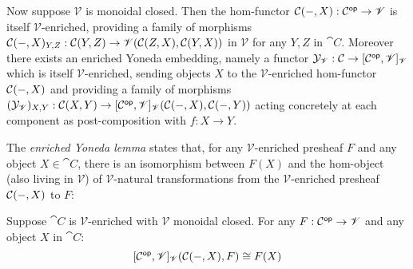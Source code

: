 \noindent Now suppose $\mathscr{V}$ is monoidal closed. Then the hom-functor ${\mathcal{C}}(-,X): \mathcal{C}^{\mathsf{op}}
\to \mathscr{V}$ is itself $\mathscr{V}$-enriched, providing a family of morphisms ${\mathcal{C}}(-,X)_{Y,Z}:
{\mathcal{C}}(Y,Z) \to {\mathscr{V}}({\mathcal{C}}(Z,X),{\mathcal{C}}(Y,X))$ in $\mathscr{V}$ for any
$Y, Z$ in $\cat{C}$. Moreover there exists an enriched Yoneda embedding, namely a functor
$\mathcal{Y}_{\mathscr{V}}: \mathcal{C} \to [\mathcal{C}^{\mathsf{op}},\mathscr{V}]_{\mathscr{V}}$ which is itself
$\mathscr{V}$-enriched, sending objects $X$ to the $\mathscr{V}$-enriched hom-functor ${\mathcal{C}}(-,X)$
and providing a family of morphisms $(\mathcal{Y}_{\mathscr{V}})_{X,Y}: {\mathcal{C}}(X,Y) \to
{[\mathcal{C}^{\mathsf{op}},\mathscr{V}]_{\mathscr{V}}}({\mathcal{C}}(-,X),{\mathcal{C}}(-,Y))$ acting
concretely at each component as post-composition with $f: X \to Y$.

The \emph{enriched Yoneda lemma} states that, for any $\mathscr{V}$-enriched presheaf $F$ and any object $X
\in \cat{C}$, there is an isomorphism between $F(X)$ and the hom-object (also living in $\mathscr{V}$) of
$\mathscr{V}$-natural transformations from the $\mathscr{V}$-enriched presheaf ${\mathcal{C}}(-,X)$ to $F$:

\begin{lemma}
Suppose $\cat{C}$ is $\mathscr{V}$-enriched with $\mathscr{V}$ monoidal closed. For any $F: \mathcal{C}^{\mathsf{op}} \to
\mathscr{V}$ and any object $X$ in $\cat{C}$:
\[{[\mathcal{C}^{\mathsf{op}},\mathscr{V}]_{\mathscr{V}}}({\mathcal{C}}(-,X),F) \cong F(X)\]
\end{lemma}


%
%
%
